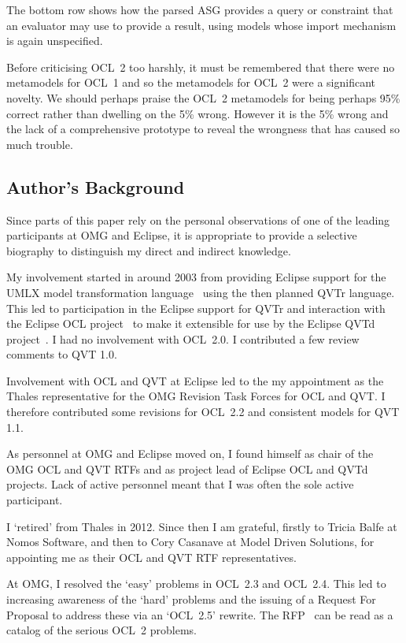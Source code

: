\documentclass{jot}
\begin{document}
The bottom row shows how the parsed ASG provides a query or constraint that an evaluator may use to provide a result, using models whose import mechanism is again unspecified.

Before criticising OCL~2 too harshly, it must be remembered that there were no metamodels for OCL~1 and so the metamodels for OCL~2 were a significant novelty. We should perhaps praise the OCL~2 metamodels for being perhaps 95\% correct rather than dwelling on the 5\% wrong. However it is the 5\% wrong and the lack of a comprehensive prototype to reveal the wrongness that has caused so much trouble.

\subsection{Author's Background}

Since parts of this paper rely on the personal observations of one of the leading participants at OMG and Eclipse, it is appropriate to provide a selective biography to distinguish my direct and indirect knowledge.

My involvement started in around 2003 from providing Eclipse support for the UMLX model transformation language~\cite{Willink-UMLX} using the then planned QVTr language. This led to participation in the Eclipse support for QVTr and interaction with the Eclipse OCL project~\cite{Eclipse-OCL} to make it extensible for use by the Eclipse QVTd project~\cite{Eclipse-QVTd}. I had no involvement with OCL~2.0. I contributed a few review comments to QVT 1.0.

Involvement with OCL and QVT at Eclipse led to the my appointment as the Thales representative for the OMG Revision Task Forces for OCL and QVT. I therefore contributed some revisions for OCL~2.2 and consistent models for QVT 1.1.

As personnel at OMG and Eclipse moved on, I found himself as chair of the OMG OCL and QVT RTFs and as project lead of Eclipse OCL and QVTd projects. Lack of active personnel meant that I was often the sole active participant.

I `retired' from Thales in 2012. Since then I am grateful, firstly to Tricia Balfe at Nomos Software, and then to Cory Casanave at Model Driven Solutions, for appointing me as their OCL and QVT RTF representatives.

At OMG, I resolved the `easy' problems in OCL~2.3 and OCL~2.4. This led to increasing awareness of the `hard' problems and the issuing of a Request For Proposal to address these via an `OCL~2.5' rewrite. The RFP~\cite{OCL-2.5-RFP} can be read as a catalog of the serious OCL~2 problems.
\end{document}
